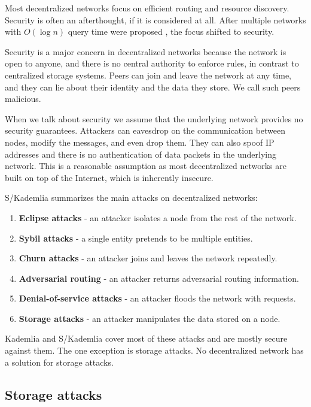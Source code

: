 Most decentralized networks focus on efficient routing and resource discovery.
Security is often an afterthought, if it is considered at all.
After multiple networks with $O(\log n)$ query time were proposed \cite{chord, kademlia, pastry},
the focus shifted to security.

Security is a major concern in decentralized networks because
the network is open to anyone, and there is no central authority to enforce rules,
in contrast to centralized storage systems.
Peers can join and leave the network at any time, and they can lie about their identity and the data they store.
We call such peers malicious.

When we talk about security we assume that the underlying network provides no security guarantees.
Attackers can eavesdrop on the communication between nodes, modify the messages, and even drop them.
They can also spoof IP addresses and there is no authentication of data packets in the underlying network.
This is a reasonable assumption as most decentralized networks are built on top of the Internet,
which is inherently insecure.

S/Kademlia \cite{skademlia} summarizes the main attacks on decentralized networks:
\begin{enumerate}
    \item \textbf{Eclipse attacks} - an attacker isolates a node from the rest of the network.
    \item \textbf{Sybil attacks} - a single entity pretends to be multiple entities.
    \item \textbf{Churn attacks} - an attacker joins and leaves the network repeatedly.
    \item \textbf{Adversarial routing} - an attacker returns adversarial routing information.
    \item \textbf{Denial-of-service attacks} - an attacker floods the network with requests.
    \item \textbf{Storage attacks} - an attacker manipulates the data stored on a node.
\end{enumerate}

Kademlia and S/Kademlia cover most of these attacks and are mostly secure against them.
The one exception is storage attacks.
No decentralized network has a solution for storage attacks.

\subsection{Storage attacks}
\label{section:storage-attacks}

